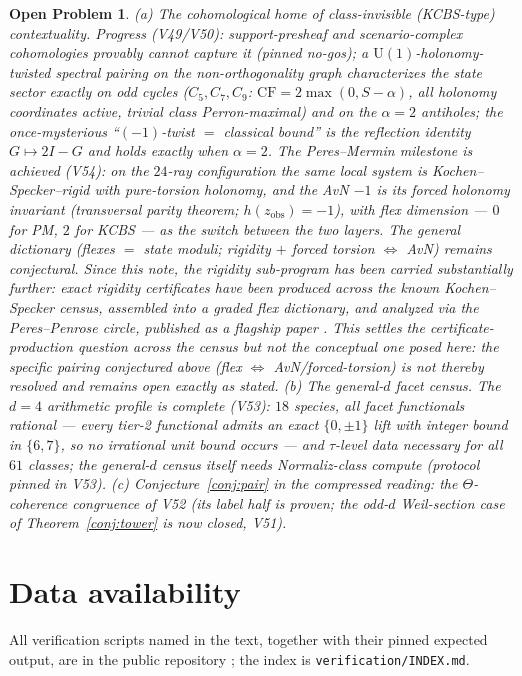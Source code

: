 \documentclass[11pt]{article}
\newtheorem{openproblem}{Open Problem}
\theoremstyle{definition}
\theoremstyle{remark}
\newcommand{\U}{\mathrm{U}}
\newcommand{\CF}{\mathrm{CF}}
\begin{document}
\begin{openproblem}
(a) The cohomological home of class-invisible (KCBS-type) contextuality. Progress
(V49/V50): support-presheaf and scenario-complex cohomologies provably cannot capture
it (pinned no-gos); a $\U(1)$-holonomy-twisted spectral pairing on the
non-orthogonality graph characterizes the state sector exactly on odd cycles
($C_5,C_7,C_9$: $\CF=2\max(0,S-\alpha)$, all holonomy coordinates active, trivial
class Perron-maximal) and on the $\alpha=2$ antiholes; the once-mysterious
``$(-1)$-twist $=$ classical bound'' is the reflection identity $G\mapsto 2I-G$ and
holds exactly when $\alpha=2$. The Peres--Mermin milestone is achieved (V54): on the
$24$-ray configuration the same local system is Kochen--Specker--rigid with pure-torsion
holonomy, and the AvN $-1$ is its \emph{forced} holonomy invariant (transversal parity
theorem; $h(z_{\mathrm{obs}})=-1$), with flex dimension --- $0$ for PM, $2$ for KCBS
--- as the switch between the two layers. The general dictionary (flexes $=$ state
moduli; rigidity $+$ forced torsion $\Leftrightarrow$ AvN) remains conjectural. Since this
note, the rigidity sub-program has been carried substantially further: exact rigidity
certificates have been produced across the known Kochen--Specker census, assembled into a
graded flex dictionary, and analyzed via the Peres--Penrose circle, published as a flagship
paper \cite{rigidity24}. This settles the certificate-production question across the census
but not the conceptual one posed here: the specific pairing conjectured above (flex
$\Leftrightarrow$ AvN/forced-torsion) is not thereby resolved and remains open exactly as
stated. (b)
The general-$d$ facet census. The $d=4$ arithmetic profile is complete (V53): $18$
species, all facet functionals rational --- every tier-2 functional admits an exact
$\{0,\pm1\}$ lift with integer bound in $\{6,7\}$, so no irrational unit bound occurs ---
and $\tau$-level data necessary for all $61$ classes; the general-$d$ census
itself needs Normaliz-class compute (protocol pinned in V53). (c)
Conjecture~\ref{conj:pair} in the compressed reading: the $\Theta$-coherence
congruence of V52 (its label half is proven; the odd-$d$ Weil-section case of
Theorem~\ref{conj:tower} is now closed, V51).
\end{openproblem}

\section*{Data availability}
All verification scripts named in the text, together with their pinned expected
output, are in the public repository \cite{repo}; the index is
\texttt{verification/INDEX.md}.
\end{document}
